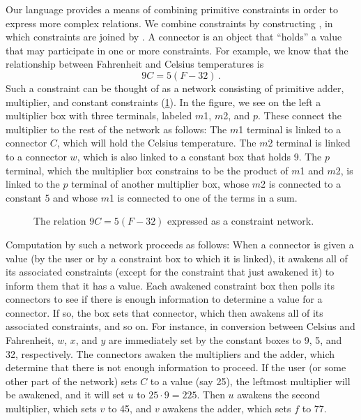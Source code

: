 Our language provides a means of combining primitive constraints in order to express more complex relations.
We combine constraints by constructing , in which constraints are joined by .
A connector is an object that “holds” a value that may participate in one or more constraints.
For example, we know that the relationship between Fahrenheit and Celsius temperatures is
\[
	9 C = 5 (F - 32) \,.
\]
Such a constraint can be thought of as a network consisting of primitive adder, multiplier, and constant constraints (\cref{Figure 3.28}).
In the figure, we see on the left a multiplier box with three terminals, labeled \( m \)1, \( m \)2, and \( p \).
These connect the multiplier to the rest of the network as follows:
The \( m \)1 terminal is linked to a connector \( C \), which will hold the Celsius temperature.
The \( m \)2 terminal is linked to a connector \( w \), which is also linked to a constant box that holds 9.
The \( p \) terminal, which the multiplier box constrains to be the product of \( m \)1 and \( m \)2, is linked to the \( p \) terminal of another multiplier box, whose \( m \)2 is connected to a constant 5 and whose \( m \)1 is connected to one of the terms in a sum.

\begin{figure}[tb]
	\centering
	
	\caption{
		The relation \( 9 C = 5 (F - 32) \) expressed as a constraint network.
	}
	\label{Figure 3.28}
\end{figure}

Computation by such a network proceeds as follows:
When a connector is given a value (by the user or by a constraint box to which it is linked), it awakens all of its associated constraints (except for the constraint that just awakened it) to inform them that it has a value.
Each awakened constraint box then polls its connectors to see if there is enough information to determine a value for a connector.
If so, the box sets that connector, which then awakens all of its associated constraints, and so on.
For instance, in conversion between Celsius and Fahrenheit, \( w \), \( x \), and \( y \) are immediately set by the constant boxes to 9, 5, and 32, respectively.
The connectors awaken the multipliers and the adder, which determine that there is not enough information to proceed.
If the user (or some other part of the network) sets \( C \) to a value (say 25), the leftmost multiplier will be awakened, and it will set \( u \) to \( 25 ⋅ 9 = 225 \).
Then \( u \) awakens the second multiplier, which sets \( v \) to 45, and \( v \) awakens the adder, which sets \( f \) to 77.



